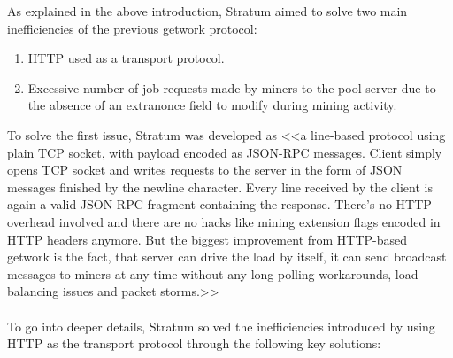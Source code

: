 As explained in the above introduction, Stratum aimed to solve two main inefficiencies of the previous getwork protocol:
\begin{enumerate}
    \item HTTP used as a transport protocol.
    \item Excessive number of job requests made by miners to the pool server due to the absence of an extranonce field to modify during mining activity.
\end{enumerate}

\noindent To solve the first issue, Stratum was developed as <<a line-based protocol using plain TCP socket, with payload encoded as JSON-RPC messages. Client simply opens TCP socket and writes requests to the server in the form of JSON messages finished by the newline character. Every line received by the client is again a valid JSON-RPC fragment containing the response. There's no HTTP overhead involved and there are no hacks like mining extension flags encoded in HTTP headers anymore. But the biggest improvement from HTTP-based getwork is the fact, that server can drive the load by itself, it can send broadcast messages to miners at any time without any long-polling workarounds, load balancing issues and packet storms.>>\cite{braiinsStratumDocs}\\\\
To go into deeper details, Stratum solved the inefficiencies introduced by using HTTP as the transport protocol through the following key solutions:
